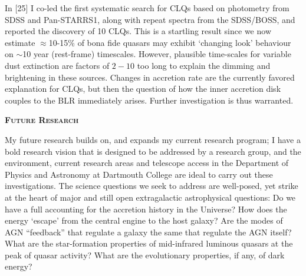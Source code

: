 \documentclass[oneside, a4paper, onecolumn, 11pt]{article}
\begin{document}
\smallskip \smallskip
\noindent 
In [25] I co-led the first systematic search for CLQs based on
photometry from SDSS and Pan-STARRS1, along with repeat spectra from
the SDSS/BOSS, and reported the discovery of 10 CLQs. This is a
startling result since we now estimate $\approx$10-15\% of bona fide
quasars may exhibit `changing look' behaviour on $\sim$10 year 
(rest-frame) timescales. However, plausible time-scales for variable
dust extinction are factors of $2-10$ too long to explain the dimming
and brightening in these sources.  Changes in accretion rate are the
currently favored explanation for CLQs, but then the question of how
the inner accretion disk couples to the BLR immediately
arises. Further investigation is thus warranted.



\medskip\medskip
\noindent
{\bfseries \large \textsc{\textcolor{Cerulean}{Future Research}}}

\smallskip
\smallskip
\noindent
My future research builds on, and expands my current research program;
I have a bold research vision that is designed to be addressed by a
research group, and the environment, current research areas and
telescope access in the Department of Physics and Astronomy at Dartmouth College
are ideal to
carry out these investigations.
The science questions we seek to address are well-posed, yet strike at
the heart of major and still open extragalactic astrophysical
questions: Do we have a full accounting for the accretion history in
the Universe?  How does the energy `escape' from the central engine to
the host galaxy?  Are the modes of AGN ``feedback'' that regulate a
galaxy the same that regulate the AGN itself?  What are the
star-formation properties of mid-infrared luminous quasars at the peak
of quasar activity?  What are the evolutionary properties, if any, of
dark energy?
\end{document}

